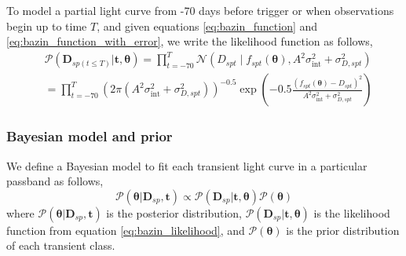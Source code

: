 \documentclass[fleqn,usenatbib]{mnras}
\begin{document}
To model a partial light curve from -70 days before trigger or when observations begin up to time $T$, and given equations \ref{eq:bazin_function} and \ref{eq:bazin_function_with_error}, we write the likelihood function as follows,
\begin{equation}
\begin{split}
    &\mathcal{P}(\bm{D}_{sp(t \le T)}|\bm{t}, \bm{\theta}) =  \prod^{T}_{t=-70} \mathcal{N} \left(  D_{spt}  \mid f_{spt}(\bm{\theta}), A^2\sigma_{\mathrm{int}}^2 +  \sigma_{D,{spt}}^2\right) \\
      &= \prod^{T}_{t=-70} \left( 2\pi(A^2\sigma_{\mathrm{int}}^2 +\sigma_{D,{spt}}^2) \right)^{-0.5} \exp{\left( -0.5 \frac{(f_{spt}(\bm{\theta})-D_{spt})^2}{A^2\sigma_{\mathrm{int}}^2 + \sigma_{D,{spt}}^2} \right) }
\end{split}
\label{eq:bazin_likelihood}
\end{equation}

\subsubsection{Bayesian model and prior}
We define a Bayesian model to fit each transient light curve in a particular passband as follows,
\begin{equation}
    \mathcal{P}(\bm{\theta}|\bm{D}_{sp},\bm{t}) \propto \mathcal{P}(\bm{D}_{sp}|\bm{t}, \bm{\theta}) \mathcal{P}(\bm{\theta})
\end{equation}
where $\mathcal{P}(\bm{\theta}|\bm{D}_{sp},\bm{t})$ is the posterior distribution, $\mathcal{P}(\bm{D}_{sp}|\bm{t}, \bm{\theta})$ is the likelihood function from equation \ref{eq:bazin_likelihood}, and $\mathcal{P}(\bm{\theta})$ is the prior distribution of each transient class.
\end{document}
